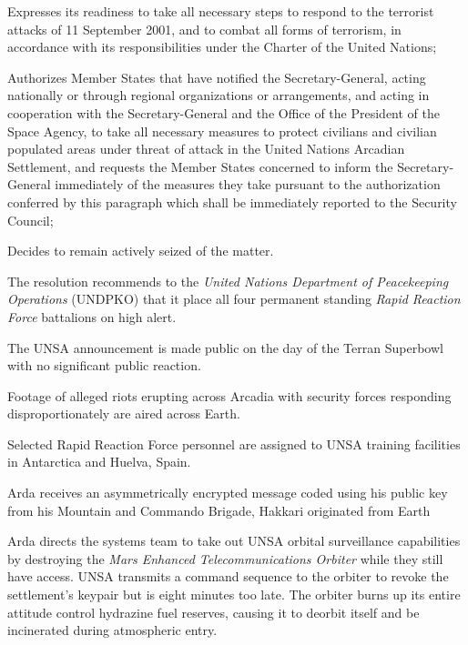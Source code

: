 \item Expresses its readiness to take all necessary steps to respond to the terrorist attacks of 11 September 2001, and to combat all forms of terrorism, in accordance with its responsibilities under the Charter of the United Nations;

\item Authorizes Member States that have notified the Secretary-General, acting nationally or through regional organizations or arrangements, and acting in cooperation with the Secretary-General and the Office of the President of the Space Agency, to take all necessary measures to protect civilians and civilian populated areas under threat of attack in the United Nations Arcadian Settlement, and requests the Member States concerned to inform the Secretary-General immediately of the measures they take pursuant to the authorization conferred by this paragraph which shall be immediately reported to the Security Council;

\item Decides to remain actively seized of the matter.
\stopitemize
\stopTimelineDocument

The resolution recommends to the {\it United Nations Department of Peacekeeping Operations} (UNDPKO) that it place all four permanent standing {\it Rapid Reaction Force} battalions on high alert.

The UNSA announcement is made public on the day of the Terran Superbowl with no significant public reaction.
\StopTimelineDate

Footage of alleged riots erupting across Arcadia with security forces responding disproportionately are aired across Earth.
\StopTimelineDate

Selected Rapid Reaction Force personnel are assigned to UNSA training facilities in Antarctica and Huelva, Spain.
\StopTimelineDate

Arda receives an asymmetrically encrypted message coded using his public key from his Mountain and Commando Brigade, Hakkari originated from Earth
\StopTimelineDate

Arda directs the systems team to take out UNSA orbital surveillance capabilities by destroying the {\it Mars Enhanced Telecommunications Orbiter} while they still have access. UNSA transmits a command sequence to the orbiter to revoke the settlement's keypair but is eight minutes too late. The orbiter burns up its entire attitude control hydrazine fuel reserves, causing it to deorbit itself and be incinerated during atmospheric entry. 

